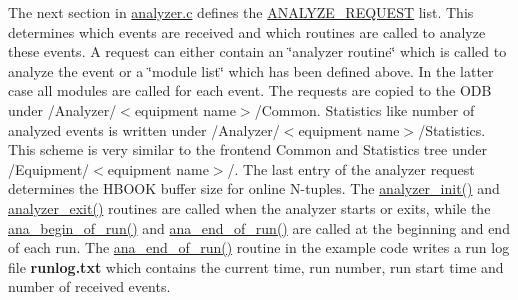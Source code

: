 The next section in \hyperlink{analyzer_8c}{analyzer.c} defines the \hyperlink{structANALYZE__REQUEST}{ANALYZE\_\-REQUEST} list. This determines which events are received and which routines are called to analyze these events. A request can either contain an \char`\"{}analyzer routine\char`\"{} which is called to analyze the event or a \char`\"{}module list\char`\"{} which has been defined above. In the latter case all modules are called for each event. The requests are copied to the ODB under /Analyzer/$<$equipment name$>$/Common. Statistics like number of analyzed events is written under /Analyzer/$<$equipment name$>$/Statistics. This scheme is very similar to the frontend Common and Statistics tree under /Equipment/$<$equipment name$>$/. The last entry of the analyzer request determines the HBOOK buffer size for online N-\/tuples. The \hyperlink{analyzer_8c_afeea792d4dbe0001bd025397e494ab5b}{analyzer\_\-init()} and \hyperlink{analyzer_8c_a7738840c25fb678186362479850b4df6}{analyzer\_\-exit()} routines are called when the analyzer starts or exits, while the \hyperlink{analyzer_8c_a22c6bd312e4f7ffd79162e64835cfd42}{ana\_\-begin\_\-of\_\-run()} and \hyperlink{analyzer_8c_a8e03cbe2637bd6f4488a659c9f23d29e}{ana\_\-end\_\-of\_\-run()} are called at the beginning and end of each run. The \hyperlink{analyzer_8c_a8e03cbe2637bd6f4488a659c9f23d29e}{ana\_\-end\_\-of\_\-run()} routine in the example code writes a \label{DataAnalysis_DA_run_log_file}
\hypertarget{DataAnalysis_DA_run_log_file}{}
 run log file {\bfseries runlog.txt} which contains the current time, run number, run start time and number of received events.

